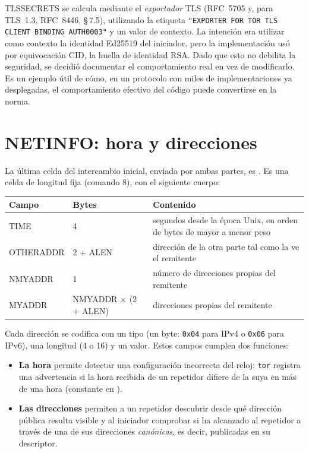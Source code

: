 \begin{approfondimento}
TLSSECRETS se calcula mediante el \emph{exportador} TLS (RFC~5705 y, para TLS~1.3, RFC~8446, §\,7.5), utilizando la etiqueta \texttt{"EXPORTER FOR TOR TLS CLIENT BINDING AUTH0003"} y un valor de contexto. La intención era utilizar como contexto la identidad Ed25519 del iniciador, pero la implementación usó por equivocación CID, la huella de identidad RSA. Dado que esto no debilita la seguridad, se decidió documentar el comportamiento real en vez de modificarlo. Es un ejemplo útil de cómo, en un protocolo con miles de implementaciones ya desplegadas, el comportamiento efectivo del código puede convertirse en la norma.
\end{approfondimento}

\section{NETINFO: hora y direcciones}\label{sec:canale-netinfo}

La última celda del intercambio inicial, enviada por ambas partes, es . Es una celda de longitud fija (comando 8), con el siguiente cuerpo:

\begin{center}
\begin{tabularx}{\textwidth}{@{}ll>{\raggedright\arraybackslash}X@{}}
\toprule
Campo & Bytes & Contenido \\
\midrule
TIME & 4 & segundos desde la época Unix, en orden de bytes de mayor a menor peso \\
OTHERADDR & 2 + ALEN & dirección de la otra parte tal como la ve el remitente \\
NMYADDR & 1 & número de direcciones propias del remitente \\
MYADDR & NMYADDR $\times$ (2 + ALEN) & direcciones propias del remitente \\
\bottomrule
\end{tabularx}
\end{center}

Cada dirección se codifica con un tipo (un byte: \texttt{0x04} para IPv4 o \texttt{0x06} para IPv6), una longitud (4 o 16) y un valor. Estos campos cumplen dos funciones:

\begin{itemize}
  \item \textbf{La hora} permite detectar una configuración incorrecta del reloj: \texttt{tor} registra una advertencia si la hora recibida de un repetidor difiere de la suya en más de una hora (constante  en ).
  \item \textbf{Las direcciones} permiten a un repetidor descubrir desde qué dirección pública resulta visible y al iniciador comprobar si ha alcanzado al repetidor a través de una de sus direcciones \emph{canónicas}, es decir, publicadas en su descriptor.
\end{itemize}

